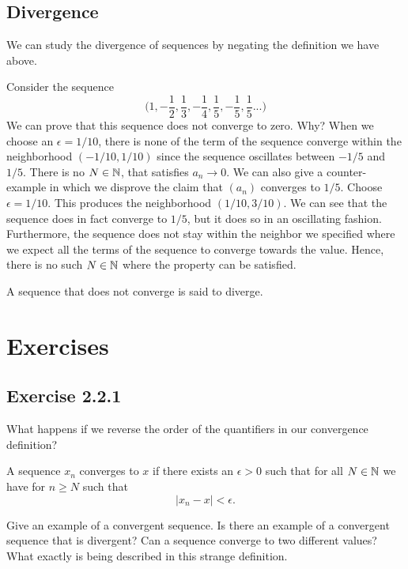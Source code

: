 \subsection{Divergence}

We can study the divergence of sequences by negating the definition we have above. 
\begin{ex}
Consider the sequence 
\[ \Big(1, -\frac{1}{2}, \frac{1}{3}, -\frac{1}{4}, \frac{1}{5}, -\frac{1}{5}, \frac{1}{5}...  \Big)\]
We can prove that this sequence does not converge to zero. Why? When we choose an \( \epsilon  = 1/10 \), there is none of the term of the sequence converge within the neighborhood \( (-1/10, 1/10 )\) since the sequence oscillates between \(-1 / 5 \)  and \( 1 / 5\). There is no \( N \in \mathbb{N} \), that satisfies \( a_n \to 0 \). We can also give a counter-example in which we disprove the claim that \( (a_n) \) converges to \( 1 / 5 \). Choose \( \epsilon = 1 / 10 \). This produces the neighborhood \( (1/10, 3/10 ) \). We can see that the sequence does in fact converge to \( 1 / 5 \), but it does so in an oscillating fashion. Furthermore, the sequence does not stay within the neighbor we specified where we expect all the terms of the sequence to converge towards the value. Hence, there is no such \( N \in \mathbb{N} \) where the property can be satisfied.  
\end{ex}


\begin{tcolorbox} 
\begin{defn}
A sequence that does not converge is said to diverge.
\end{defn}
\end{tcolorbox}


\section{Exercises}

\subsection{Exercise 2.2.1} What happens if we reverse the order of the quantifiers in our convergence definition? 
\begin{tcolorbox}
    \begin{defn}[Reversed]
A sequence \( x_n \) converges to \( x \) if there exists an \( \epsilon > 0 \) such that for all \( N \in \mathbb{N} \) we have for \( n \geq N \) such that 
\[ |x_n  - x| < \epsilon.\]
\end{defn}
\end{tcolorbox}
Give an example of a convergent sequence. Is there an example of a convergent sequence that is divergent? Can a sequence converge to two different values? What exactly is being described in this strange definition.

